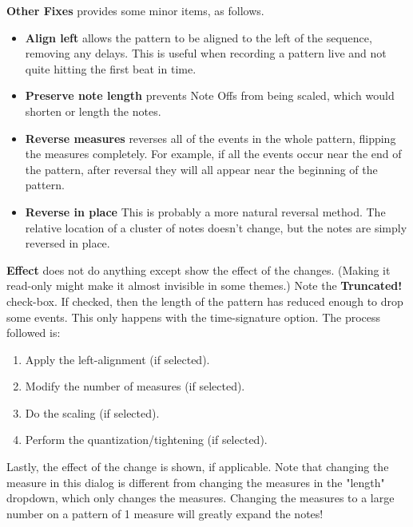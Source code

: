    \textbf{Other Fixes} provides some minor items, as follows.

   \begin{itemize}
      \item \textbf{Align left}
         allows the pattern to be aligned to the left of the sequence, removing
         any delays.  This is useful when recording a pattern live and not quite
         hitting the first beat in time.
      \item \textbf{Preserve note length}
         prevents Note Offs from being scaled, which would shorten or length the
         notes.
      \item \textbf{Reverse measures}
         reverses all of the events in the whole pattern, flipping the measures
         completely.  For example, if all the events occur near the end of the
         pattern, after reversal they will all appear near the beginning of the
         pattern.
      \item \textbf{Reverse in place}
         This is probably a more natural reversal method.
         The relative location of a cluster of notes doesn't change, but the
         notes are simply reversed in place.
   \end{itemize}


   \textbf{Effect} does not do anything except show the effect of the changes.
   (Making it read-only might make it almost invisible in some themes.)
   Note the \textbf{Truncated!} check-box.  If checked, then
   the length of the pattern has reduced enough to drop some events.
   This only happens with the time-signature option.
   The process followed is:

   \begin{enumerate}
      \item Apply the left-alignment (if selected).
      \item Modify the number of measures (if selected).
      \item Do the scaling (if selected).
      \item Perform the quantization/tightening (if selected).
   \end{enumerate}

   Lastly, the effect of the change is shown, if applicable.
   Note that changing the measure in this dialog is different from
   changing the measures in the "length" dropdown, which only changes the
   measures.
   Changing the measures to a large number on a pattern of 1 measure will
   greatly expand the notes!

